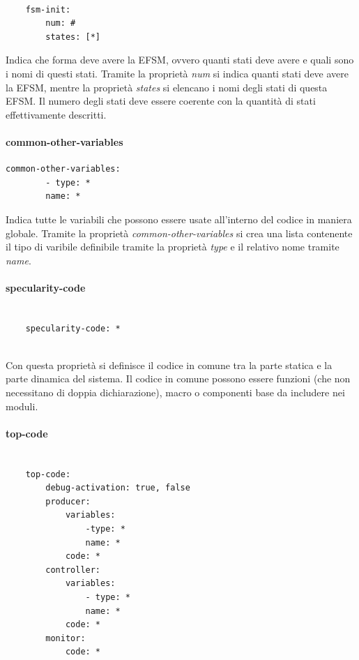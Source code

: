 \documentclass[a4paper,titlepage]{book}
\begin{document}
\begin{lstlisting}[frame=single]

	fsm-init:
		num: #
		states: [*]

\end{lstlisting} 

Indica che forma deve avere la EFSM, ovvero quanti stati deve avere e quali sono i nomi di questi stati. Tramite la proprietà \textit{num} si indica quanti stati deve avere la EFSM, mentre la proprietà \textit{states} si elencano i nomi degli stati di questa EFSM. Il numero degli stati deve essere coerente con la quantità di stati effettivamente descritti.

\paragraph{common-other-variables}

\begin{lstlisting}[frame=single]
	common-other-variables:
		- type: *
		name: *
\end{lstlisting}

Indica tutte le variabili che possono essere usate all'interno del codice in maniera globale. Tramite la proprietà \textit{common-other-variables} si crea una lista contenente il tipo di varibile definibile tramite la proprietà \textit{type} e il relativo nome tramite \textit{name}.

\paragraph{specularity-code}
\begin{lstlisting}[frame=single]
	
	specularity-code: *
	
\end{lstlisting}

Con questa proprietà si definisce il codice in comune tra la parte statica e la parte dinamica del sistema. Il codice in comune possono essere funzioni (che non necessitano di doppia dichiarazione), macro o componenti base da includere nei moduli.

\paragraph{top-code}

\begin{lstlisting}[frame=single]

	top-code:
		debug-activation: true, false
		producer:
			variables:
				-type: *
				name: *
			code: *
		controller:
			variables:
				- type: *
				name: *
			code: *
		monitor:
			code: *

\end{lstlisting}
\end{document}
